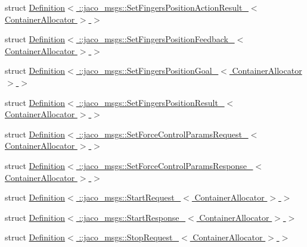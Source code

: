 \begin{DoxyCompactItemize}
struct \hyperlink{structros_1_1message__traits_1_1Definition_3_01_1_1jaco__msgs_1_1SetFingersPositionActionResult_d77f823cc2975df7a63f01b98938519f}{Definition$<$ \+::jaco\+\_\+msgs\+::\+Set\+Fingers\+Position\+Action\+Result\+\_\+$<$ Container\+Allocator $>$ $>$}
\item 
struct \hyperlink{structros_1_1message__traits_1_1Definition_3_01_1_1jaco__msgs_1_1SetFingersPositionFeedback___3_01ContainerAllocator_01_4_01_4}{Definition$<$ \+::jaco\+\_\+msgs\+::\+Set\+Fingers\+Position\+Feedback\+\_\+$<$ Container\+Allocator $>$ $>$}
\item 
struct \hyperlink{structros_1_1message__traits_1_1Definition_3_01_1_1jaco__msgs_1_1SetFingersPositionGoal___3_01ContainerAllocator_01_4_01_4}{Definition$<$ \+::jaco\+\_\+msgs\+::\+Set\+Fingers\+Position\+Goal\+\_\+$<$ Container\+Allocator $>$ $>$}
\item 
struct \hyperlink{structros_1_1message__traits_1_1Definition_3_01_1_1jaco__msgs_1_1SetFingersPositionResult___3_01ContainerAllocator_01_4_01_4}{Definition$<$ \+::jaco\+\_\+msgs\+::\+Set\+Fingers\+Position\+Result\+\_\+$<$ Container\+Allocator $>$ $>$}
\item 
struct \hyperlink{structros_1_1message__traits_1_1Definition_3_01_1_1jaco__msgs_1_1SetForceControlParamsRequest___c59584efc00e1eca7e3af5d8ad03eba5}{Definition$<$ \+::jaco\+\_\+msgs\+::\+Set\+Force\+Control\+Params\+Request\+\_\+$<$ Container\+Allocator $>$ $>$}
\item 
struct \hyperlink{structros_1_1message__traits_1_1Definition_3_01_1_1jaco__msgs_1_1SetForceControlParamsResponse__095d983db8d83707a3d1e1cd70107388}{Definition$<$ \+::jaco\+\_\+msgs\+::\+Set\+Force\+Control\+Params\+Response\+\_\+$<$ Container\+Allocator $>$ $>$}
\item 
struct \hyperlink{structros_1_1message__traits_1_1Definition_3_01_1_1jaco__msgs_1_1StartRequest___3_01ContainerAllocator_01_4_01_4}{Definition$<$ \+::jaco\+\_\+msgs\+::\+Start\+Request\+\_\+$<$ Container\+Allocator $>$ $>$}
\item 
struct \hyperlink{structros_1_1message__traits_1_1Definition_3_01_1_1jaco__msgs_1_1StartResponse___3_01ContainerAllocator_01_4_01_4}{Definition$<$ \+::jaco\+\_\+msgs\+::\+Start\+Response\+\_\+$<$ Container\+Allocator $>$ $>$}
\item 
struct \hyperlink{structros_1_1message__traits_1_1Definition_3_01_1_1jaco__msgs_1_1StopRequest___3_01ContainerAllocator_01_4_01_4}{Definition$<$ \+::jaco\+\_\+msgs\+::\+Stop\+Request\+\_\+$<$ Container\+Allocator $>$ $>$}
\item 

\end{DoxyCompactItemize}
